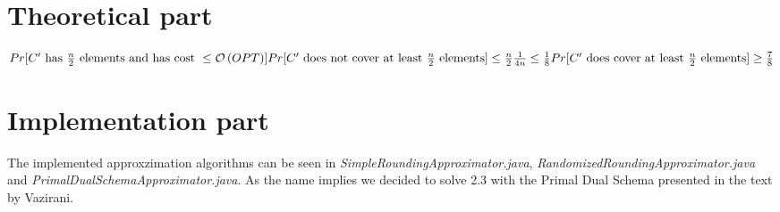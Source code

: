 \section{Theoretical part}


\begin{math}
Pr[C'\text{ has } \frac{n}{2} \text{ elements and has cost } \leq \mathcal{O}\left(OPT\right)]\\
\\
Pr[C' \text{ does not cover at least } \frac{n}{2} \text{ elements}] \leq \frac{n}{2} \frac{1}{4n} \leq \frac{1}{8}\\
\\
Pr[C' \text{ does cover at least } \frac{n}{2} \text{ elements}] \geq \frac{7}{8}
\end{math}

\section{Implementation part}
The implemented approxzimation algorithms can be seen in \textit{SimpleRoundingApproximator.java}, \textit{RandomizedRoundingApproximator.java} and \textit{PrimalDualSchemaApproximator.java}. As the name implies we decided to solve 2.3 with the Primal Dual Schema presented in the text by Vazirani.
